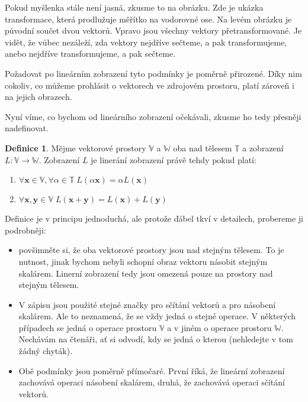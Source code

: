 \documentclass[a5paper,12pt]{amsbook}
\theoremstyle{definition}
\newtheorem{definition}{Definice}[chapter]
\newcommand{\myscalar}[1]{#1}
\newcommand{\myvec}[1]{\bm{#1}}
\newcommand{\myspace}[1]{\mathbb{#1}}
\newcommand{\mymap}[1]{#1}
\begin{document}
Pokud myšlenka stále není jasná, zkusme to na obrázku. Zde je ukázka transformace, která prodlužuje
měřítko na vodorovné ose. Na levém obrázku je původní součet dvou vektorů. Vpravo jsou všechny vektory
přetransformované. Je vidět, že vůbec nezáleží, zda vektory nejdříve sečteme, a pak transformujeme,
anebo nejdříve transformujeme, a pak sečteme.

\begin{center}

\end{center}

\noindent Požadovat po lineárním zobrazení tyto podmínky je poměrně přirozené. Díky nim cokoliv, co můžeme
prohlásit o vektorech ve zdrojovém prostoru, platí zároveň i na jejich obrazech.

Nyní víme, co bychom od lineárního zobrazení očekávali, zkusme ho tedy přesněji nadefinovat.

\begin{definition}
Mějme vektorové prostory $\myspace{V}$ a $\myspace{W}$ oba nad tělesem $\myspace{T}$ a zobrazení
$\mymap{L}: \myspace{V}\rightarrow\myspace{W}$. Zobrazení $\mymap{L}$ je linerání zobrazení právě tehdy
pokud platí:

\begin{enumerate}
  \item $\forall\myvec{x}\in\myspace{V},\forall\myscalar{\alpha}\in\myspace{T}\;
    \mymap{L}(\myscalar{\alpha}\myvec{x})=\myscalar{\alpha}L(\myvec{x})$
  \item $\forall\myvec{x},\myvec{y}\in\myspace{V}\;\mymap{L}(\myvec{x}+\myvec{y})
    =\mymap{L}(\myvec{x})+\mymap{L}(\myvec{y})$
\end{enumerate}

\end{definition}

\noindent Definice je v principu jednoduchá, ale protože ďábel tkví v detailech, probereme ji podrobněji:

\begin{itemize}
  \item povšimněte si, že oba vektorové prostory jsou nad stejným tělesem. To je nutnost, jinak bychom
    nebyli schopní obraz vektoru násobit stejným skalárem. Linerní zobrazení tedy jsou omezená pouze
    na prostory nad stejným tělesem.
  \item V zápisu jsou použité stejné značky pro sčítání vektorů a pro násobení skalárem. Ale to neznamená,
    že se vždy jedná o stejné operace. V některých případech se jedná o operace prostoru $\myspace{V}$
    a v jiném o operace prostoru $\myspace{W}$. Nechávám na čtenáři, ať si odvodí, kdy se jedná o kterou
    (nehledejte v tom žádný chyták).
  \item Obě podmínky jsou poměrně přímočaré. První říká, že lineární zobrazení zachovává operaci násobení
    skalárem, druhá, že zachovává operaci sčítání vektorů.
\end{itemize}
\end{document}
